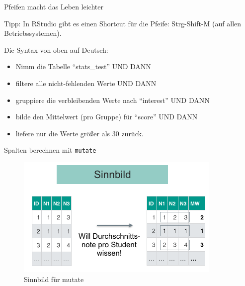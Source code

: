 \begin{frame}{Pfeifen macht das Leben leichter}

Tipp: In RStudio gibt es einen Shortcut für die Pfeife: Strg-Shift-M
(auf allen Betriebssystemen).

Die Syntax von oben auf Deutsch:

\begin{itemize}
\tightlist
\item
  Nimm die Tabelle ``stats\_test'' UND DANN\\
\item
  filtere alle nicht-fehlenden Werte UND DANN\\
\item
  gruppiere die verbleibenden Werte nach ``interest'' UND DANN\\
\item
  bilde den Mittelwert (pro Gruppe) für ``score'' UND DANN\\
\item
  liefere nur die Werte größer als 30 zurück.
\end{itemize}

\end{frame}

\begin{frame}{Spalten berechnen mit \texttt{mutate}}

\begin{figure}

{\centering \includegraphics[width=0.8\linewidth]{../images/Datenjudo/mutate} 

}

\caption{Sinnbild für mutate}\label{fig:fig-mutate}
\end{figure}

\end{frame}


